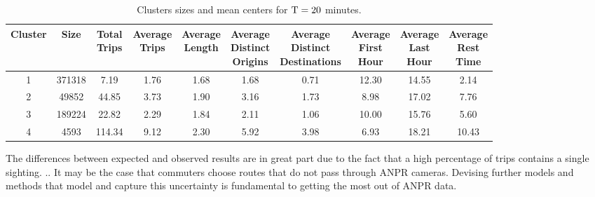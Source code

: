 \begin{table*}[t]
\centering
\small
\begin{tabular}{c c c c c c c c c c}
  \hline
 Cluster &  Size & \thead{Total\\Trips} & \thead{Average\\Trips} & \thead{Average\\Length} & \thead{Average\\Distinct\\Origins} & \thead{Average\\Distinct\\Destinations} & \thead{Average\\First\\Hour} & \thead{Average\\Last\\Hour} & \thead{Average\\Rest\\Time} \\
  \hline
  1 & 371318 & 7.19 & 1.76 & 1.68 & 1.68 & 0.71 & 12.30 & 14.55 & 2.14 \\
    2 & 49852 & 44.85 & 3.73 & 1.90 & 3.16 & 1.73 & 8.98 & 17.02 & 7.76 \\
    3 & 189224 & 22.82 & 2.29 & 1.84 & 2.11 & 1.06 & 10.00 & 15.76 & 5.60 \\
    4 & 4593 & 114.34 & 9.12 & 2.30 & 5.92 & 3.98 & 6.93 & 18.21 & 10.43 \\
   \hline
\end{tabular}
\caption{Clusters sizes and mean centers for $\mathrm{T} = 20$ minutes.}
\label{t:kmeans_centers_1200}
\end{table*}

The differences between expected and observed results are in great part due to the fact that a high percentage of trips contains a single sighting. .. It may be the case that commuters choose routes that do not pass through ANPR cameras. Devising further models and methods that model and capture this uncertainty is fundamental to getting the most out of ANPR data.
